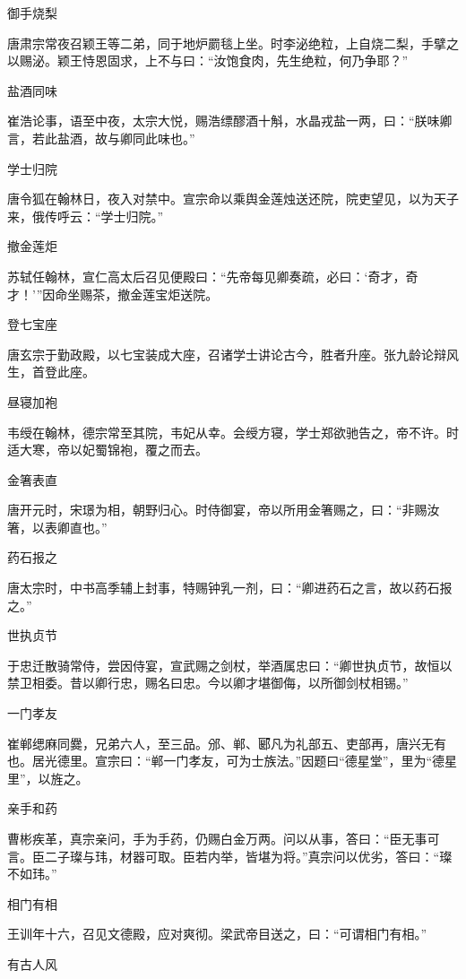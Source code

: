 \documentclass[a4paper,12pt,UTF8,twoside]{ctexbook}
\begin{document}
    御手烧梨
    
    唐肃宗常夜召颖王等二弟，同于地炉罽毯上坐。时李泌绝粒，上自烧二梨，手擘之以赐泌。颖王恃恩固求，上不与曰：“汝饱食肉，先生绝粒，何乃争耶？”
    
    盐酒同味
    
    崔浩论事，语至中夜，太宗大悦，赐浩缥醪酒十斛，水晶戎盐一两，曰：“朕味卿言，若此盐酒，故与卿同此味也。”
    
    学士归院
    
    唐令狐在翰林日，夜入对禁中。宣宗命以乘舆金莲烛送还院，院吏望见，以为天子来，俄传呼云：“学士归院。”
    
    撤金莲炬
    
    苏轼任翰林，宣仁高太后召见便殿曰：“先帝每见卿奏疏，必曰：‘奇才，奇才！’”因命坐赐茶，撤金莲宝炬送院。
    
    登七宝座
    
    唐玄宗于勤政殿，以七宝装成大座，召诸学士讲论古今，胜者升座。张九龄论辩风生，首登此座。
    
    昼寝加袍
    
    韦绶在翰林，德宗常至其院，韦妃从幸。会绶方寝，学士郑欲驰告之，帝不许。时适大寒，帝以妃蜀锦袍，覆之而去。
    
    金箸表直
    
    唐开元时，宋璟为相，朝野归心。时侍御宴，帝以所用金箸赐之，曰：“非赐汝箸，以表卿直也。”
    
    药石报之
    
    唐太宗时，中书高季辅上封事，特赐钟乳一剂，曰：“卿进药石之言，故以药石报之。”
    
    世执贞节
    
    于忠迁散骑常侍，尝因侍宴，宣武赐之剑杖，举酒属忠曰：“卿世执贞节，故恒以禁卫相委。昔以卿行忠，赐名曰忠。今以卿才堪御侮，以所御剑杖相锡。”
    
    一门孝友
    
    崔郸缌麻同爨，兄弟六人，至三品。邠、郸、郾凡为礼部五、吏部再，唐兴无有也。居光德里。宣宗曰：“郸一门孝友，可为士族法。”因题曰“德星堂”，里为“德星里”，以旌之。
    
    亲手和药
    
    曹彬疾革，真宗亲问，手为手药，仍赐白金万两。问以从事，答曰：“臣无事可言。臣二子璨与玮，材器可取。臣若内举，皆堪为将。”真宗问以优劣，答曰：“璨不如玮。”
    
    相门有相
    
    王训年十六，召见文德殿，应对爽彻。梁武帝目送之，曰：“可谓相门有相。”
    
    有古人风
    
\end{document}
